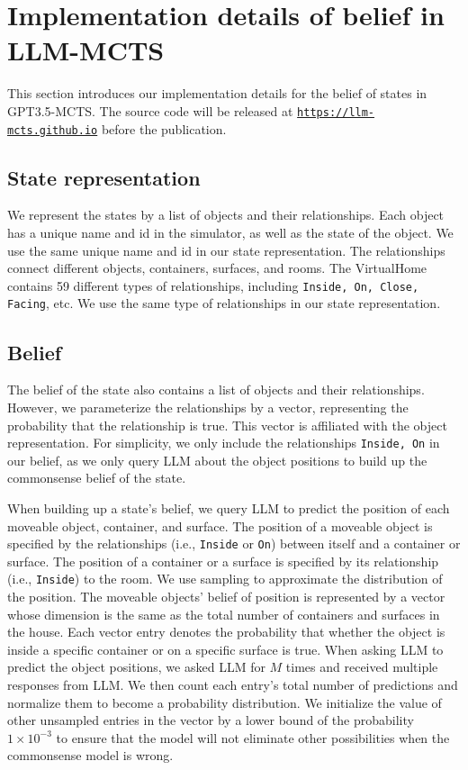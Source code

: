 \section{Implementation details of belief in LLM-MCTS}
This section introduces our implementation details for the belief of states in GPT3.5-MCTS. 
The source code will be released at \href{https://llm-mcts.github.io}{\texttt{https://llm-mcts.github.io}} before the publication. 

\subsection{State representation}

We represent the states by a list of objects and their relationships. Each object has a unique name and id in the simulator, as well as the state of the object. We use the same unique name and id in our state representation. The relationships connect different objects, containers, surfaces, and rooms. The VirtualHome contains 59 different types of relationships, including \texttt{Inside, On, Close, Facing}, etc. We use the same type of relationships in our state representation. 

\subsection{Belief}\label{app-sec:belief}

The belief of the state also contains a list of objects and their relationships. However, we parameterize the relationships by a vector, representing the probability that the relationship is true. This vector is affiliated with the object representation. For simplicity, we only include the relationships \texttt{Inside, On} in our belief, as we only query LLM about the object positions to build up the commonsense belief of the state. 

When building up a state's belief, we query LLM to predict the position of each moveable object, container, and surface. The position of a moveable object is specified by the relationships (i.e., \texttt{Inside} or \texttt{On}) between itself and a container or surface. The position of a container or a surface is specified by its relationship (i.e., \texttt{Inside}) to the room. We use sampling to approximate the distribution of the position. The moveable objects' belief of position is represented by a vector whose dimension is the same as the total number of containers and surfaces in the house. Each vector entry denotes the probability that whether the object is inside a specific container or on a specific surface is true. When asking LLM to predict the object positions, we asked LLM for $M$ times and received multiple responses from LLM. We then count each entry's total number of predictions and normalize them to become a probability distribution. We initialize the value of other unsampled entries in the vector by a lower bound of the probability $1\times 10^{-3}$ to ensure that the model will not eliminate other possibilities when the commonsense model is wrong.

